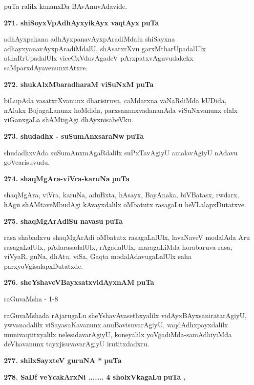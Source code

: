 \smallskip
puTa ralilx kananxDa BAvAnuvAdavide.

\eject

\noindent
\textbf{271. shiSoyxVpAdhAyxyikAyx vaqtAyx} \hfill{\bf puTa }

\smallskip
adhAyxpakana adhAyxpanavAyxpAradiMdalu shiSayxna adhayxyanavAyxpAradiMdalU, shAsatxrXvu garxMtharUpadalUlx athaRrUpadalUlx viceCxVdavAgadeV pArxpatxvAguvudakekx saMparxdAyavenunxtAtxre.

\medskip
\noindent
\textbf{272. shukAlxMbaradharaM viSuNxM} \hfill{\bf puTa }

\smallskip
biLupAda vasatxrXvanunx dharisiruva, caMdarxna vaNaRdiMda kUDida, nAlukx BujagaLanunx hoMdida, parxsananxvadananAda viSuNxvanunx elalx viGanxgaLa shAMtigAgi dhAyxnisabeVku.

\medskip
\noindent
\textbf{273. shudadhx - suSumAnxsaraNw} \hfill{\bf puTa }

\smallskip
shudadhxvAda suSumAnxmAgaRdalilx suPxTavAgiyU amalavAgiyU nAdavu goVcarisuvudu.

\medskip
\noindent
\textbf{274. shaqMgAra-viVra-karuNa} \hfill{\bf puTa }

\smallskip
shaqMgAra, viVra, karuNa, aduBxta, hAsayx, BayAnaka, biVBatasx, rwdarx, hAgu shAMtaveMbudAgi kAvayxdalilx oMbatutx rasagaLu heVLalapxDutatxve.

\medskip
\noindent
\textbf{275. shaqMgArAdiSu navasu} \hfill{\bf puTa }

\smallskip
rasa shabadxvu shaqMgArAdi oMbatutx rasagaLalUlx, lavaNaveV modalAda Aru rasagaLalUlx, pAdarasadalUlx, rAgadalUlx, maragaLiMda horabaruva rasa, viVyaR, guNa, dhAtu, viSa, Gaqta modalAdavugaLalUlx saha parxyoVgisalapxDutatxde.

\smallskip
\noindent
\textbf{276. sheYshaveVBayxsatxvidAyxnAM} \hfill{\bf puTa }

\hfill{raGuvaMsha - 1-8}

raGuvaMshada rAjarugaLu sheYshavAvasethxyalilx vidAyxBAyxsaniratarAgiyU, ywvanadalilx viSayasuKavanunx anuBavisuvarAgiyU, vaqdAdhxpayxdalilx munivaqtitxyalilx nelesidavarAgiyU, koneyalilx yoVgadiMda-samAdhiyiMda deVhavanunx tayxjisuvavarAgiyU irutitxdadxru.

\medskip
\noindent
\textbf{277. shilxSayxteV guruNA *} \hfill{\bf puTa }


\medskip
\noindent
\textbf{278. SaDf veYcakArxNi ....... 4 sholxVkagaLu} \hfill{\bf puTa , }

